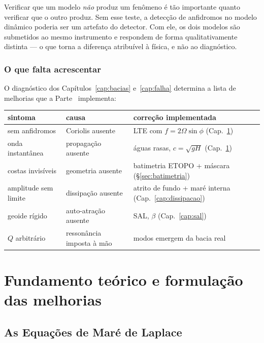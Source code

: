 \documentclass[11pt,a4paper,oneside]{report}
\theoremstyle{definition}
\theoremstyle{plain}
\theoremstyle{remark}
\begin{document}
\begin{caixa}
Verificar que um modelo \emph{não} produz um fenômeno é tão importante quanto
verificar que o outro produz. Sem esse teste, a detecção de anfidromos no
modelo dinâmico poderia ser um artefato do detector. Com ele, os dois modelos
são submetidos ao mesmo instrumento e respondem de forma qualitativamente
distinta — o que torna a diferença atribuível à física, e não ao diagnóstico.
\end{caixa}

\section{O que falta acrescentar}

O diagnóstico dos Capítulos~\ref{cap:bacias} e~\ref{cap:falha} determina a
lista de melhorias que a Parte~\ref{parte:melhorias} implementa:

\begin{center}
\small
\begin{tabular}{@{}lll@{}}
\toprule
sintoma & causa & correção implementada \\
\midrule
sem anfidromos & Coriolis ausente & LTE com $f=2\Omega\sin\phi$ (Cap.~\ref{cap:lte}) \\
onda instantânea & propagação ausente & águas rasas, $c=\sqrt{gH}$ (Cap.~\ref{cap:lte}) \\
costas invisíveis & geometria ausente & batimetria ETOPO + máscara (\S\ref{sec:batimetria}) \\
amplitude sem limite & dissipação ausente & atrito de fundo + maré interna (Cap.~\ref{cap:dissipacao}) \\
geoide rígido & auto-atração ausente & SAL, $\beta$ (Cap.~\ref{cap:sal}) \\
$Q$ arbitrário & ressonância imposta à mão & modos emergem da bacia real \\
\bottomrule
\end{tabular}
\end{center}

\part{Fundamento teórico e formulação das melhorias}
\label{parte:melhorias}

\chapter{As Equações de Maré de Laplace}
\label{cap:lte}
\end{document}
